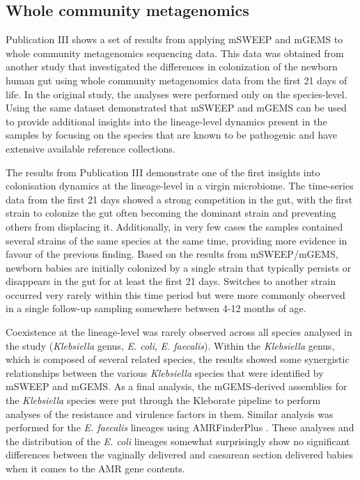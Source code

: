 \documentclass[officiallayout]{tktla}
\begin{document}
\subsection{Whole community metagenomics}

Publication III shows a set of results from applying mSWEEP and mGEMS
to whole community metagenomics sequencing data. This data was obtained from
another study \citep{shao2019stunted} that investigated the differences in
colonization of the newborn human gut using whole community metagenomics data from
the first 21 days of life. In the original study, the analyses were
performed only on the species-level. Using the same dataset demonstrated that mSWEEP and mGEMS can be used to provide additional
insights into the lineage-level dynamics present in the samples by
focusing on the species that are known to be pathogenic and have
extensive available reference collections.

The results from Publication III demonstrate one of the first insights into
colonisation dynamics at the lineage-level in a virgin microbiome. The
time-series data from the first 21 days showed a strong competition in
the gut, with the first strain to colonize the gut often becoming the
dominant strain and preventing others from displacing
it. Additionally, in very few cases the samples contained several
strains of the same species at the same time, providing more
evidence in favour of the previous finding. Based on the results from
mSWEEP/mGEMS, newborn babies are initially colonized by a single
strain that typically persists or disappears in the gut for at least
the first 21 days. Switches to another strain occurred very rarely
within this time period but were more commonly observed in a single
follow-up sampling somewhere between 4-12 months of age.

Coexistence at the lineage-level was rarely observed across all
species analysed in the study (\textit{Klebsiella} genus,
\textit{E. coli}, \textit{E. faecalis}). Within the
\textit{Klebsiella} genus, which is composed of several related
species, the results showed some synergistic relationships between the
various \textit{Klebsiella} species that were identified by mSWEEP and
mGEMS. As a final analysis, the mGEMS-derived assemblies for the
\textit{Klebsiella} species were put through the Kleborate
\citep{lam2021genomic} pipeline to perform analyses of the resistance
and virulence factors in them. Similar analysis was performed for the
\textit{E. faecalis} lineages using AMRFinderPlus
\citep{feldgarden2021amrfinderplus}. These analyses and the
distribution of the \textit{E. coli} lineages somewhat surprisingly
show no significant differences between the vaginally delivered and
caesarean section delivered babies when it comes to the AMR gene
contents.
\end{document}
